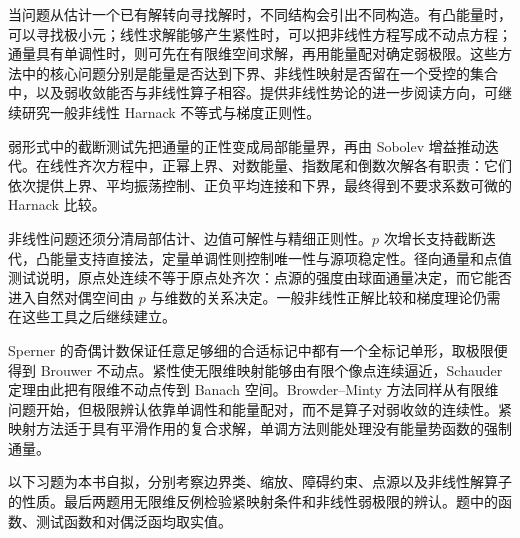 \ProseParagraphBreak
当问题从估计一个已有解转向寻找解时，不同结构会引出不同构造。有凸能量时，可以寻找极小元；线性求解能够产生紧性时，可以把非线性方程写成不动点方程；通量具有单调性时，则可先在有限维空间求解，再用能量配对确定弱极限。这些方法中的核心问题分别是能量是否达到下界、非线性映射是否留在一个受控的集合中，以及弱收敛能否与非线性算子相容。\cite{Heinonen2006Nonlinear}提供非线性势论的进一步阅读方向，可继续研究一般非线性 Harnack 不等式与梯度正则性。






\begin{chaptersummary}
弱形式中的截断测试先把通量的正性变成局部能量界，再由 Sobolev 增益推动迭代。在线性齐次方程中，正幂上界、对数能量、指数尾和倒数次解各有职责：它们依次提供上界、平均振荡控制、正负平均连接和下界，最终得到不要求系数可微的 Harnack 比较。

\ProseParagraphBreak
非线性问题还须分清局部估计、边值可解性与精细正则性。\(p\) 次增长支持截断迭代，凸能量支持直接法，定量单调性则控制唯一性与源项稳定性。径向通量和点值测试说明，原点处连续不等于原点处齐次：点源的强度由球面通量决定，而它能否进入自然对偶空间由 \(p\) 与维数的关系决定。一般非线性正解比较和梯度理论仍需在这些工具之后继续建立。

\ProseParagraphBreak

Sperner 的奇偶计数保证任意足够细的合适标记中都有一个全标记单形，取极限便得到 Brouwer 不动点。紧性使无限维映射能够由有限个像点连续逼近，Schauder 定理由此把有限维不动点传到 Banach 空间。Browder--Minty 方法同样从有限维问题开始，但极限辨认依靠单调性和能量配对，而不是算子对弱收敛的连续性。紧映射方法适于具有平滑作用的复合求解，单调方法则能处理没有能量势函数的强制通量。
\end{chaptersummary}

\BookExercises

以下习题为本书自拟，分别考察边界类、缩放、障碍约束、点源以及非线性解算子的性质。最后两题用无限维反例检验紧映射条件和非线性弱极限的辨认。题中的函数、测试函数和对偶泛函均取实值。

